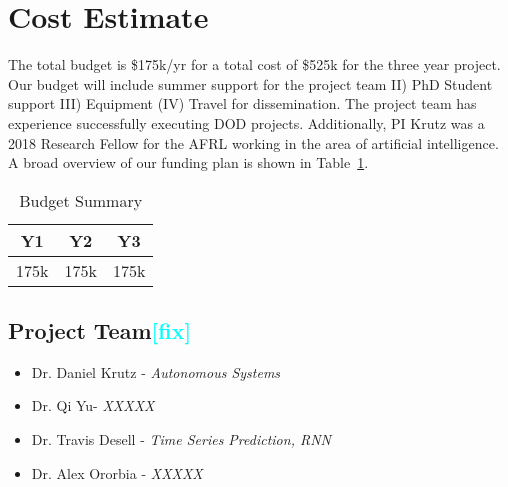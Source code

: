 \documentclass[12pt]{article}
\newcommand{\todo}[1]{\textcolor{cyan}{\textbf{[#1]}}}
\begin{document}


\section{Cost Estimate} %


The total budget is \$175k/yr for a total cost of \$525k for the three year project. Our budget will include summer support for the project team  II) PhD Student support III) Equipment (IV) Travel for dissemination. The project team has experience successfully executing DOD projects. %
Additionally, PI Krutz was a 2018 Research Fellow for the AFRL working in the area of artificial intelligence. A broad overview of our funding plan is shown in Table~\ref{table:budget}.

\begin{table}[h]
\begin{center}
\caption{Budget Summary}
\label{table:budget}

\begin{tabular}{ c | c | c  }
			
  \textbf{Y1} & \textbf{Y2} & \textbf{Y3} \\   \hline
  175k & 175k & 175k \\
   \end{tabular}
  \end{center}
\end{table}



\vspace{-5mm}
\subsection*{Project Team\todo{fix}}


\setlength\columnsep{65pt}
 \begin{multicols}{2}
     \begin{itemize}[noitemsep, leftmargin=*]
        \item Dr. Daniel Krutz - \emph{Autonomous Systems}
        \item Dr. Qi Yu- \emph{XXXXX}
        \item Dr. Travis Desell - \emph{Time Series Prediction, RNN}
        \item Dr. Alex Ororbia - \emph{XXXXX}
    \end{itemize}
\end{multicols}
\end{document}
